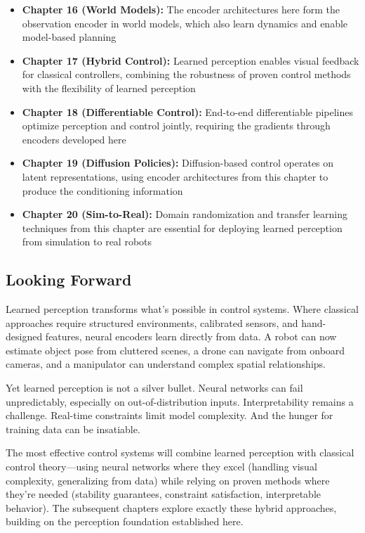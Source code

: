 \begin{itemize}
    \item \textbf{Chapter 16 (World Models):} The encoder architectures here form the observation encoder in world models, which also learn dynamics and enable model-based planning

    \item \textbf{Chapter 17 (Hybrid Control):} Learned perception enables visual feedback for classical controllers, combining the robustness of proven control methods with the flexibility of learned perception

    \item \textbf{Chapter 18 (Differentiable Control):} End-to-end differentiable pipelines optimize perception and control jointly, requiring the gradients through encoders developed here

    \item \textbf{Chapter 19 (Diffusion Policies):} Diffusion-based control operates on latent representations, using encoder architectures from this chapter to produce the conditioning information

    \item \textbf{Chapter 20 (Sim-to-Real):} Domain randomization and transfer learning techniques from this chapter are essential for deploying learned perception from simulation to real robots
\end{itemize}

\subsection{Looking Forward}

Learned perception transforms what's possible in control systems. Where classical approaches require structured environments, calibrated sensors, and hand-designed features, neural encoders learn directly from data. A robot can now estimate object pose from cluttered scenes, a drone can navigate from onboard cameras, and a manipulator can understand complex spatial relationships.

Yet learned perception is not a silver bullet. Neural networks can fail unpredictably, especially on out-of-distribution inputs. Interpretability remains a challenge. Real-time constraints limit model complexity. And the hunger for training data can be insatiable.

The most effective control systems will combine learned perception with classical control theory---using neural networks where they excel (handling visual complexity, generalizing from data) while relying on proven methods where they're needed (stability guarantees, constraint satisfaction, interpretable behavior). The subsequent chapters explore exactly these hybrid approaches, building on the perception foundation established here.


